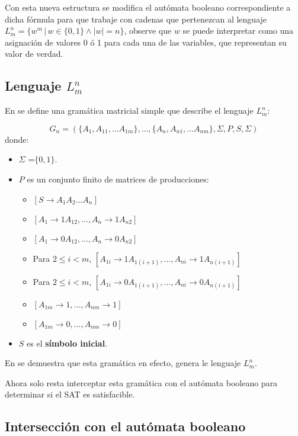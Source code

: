 \documentclass[12pt]{article}
\begin{document}
Con esta nueva estructura se modifica el autómata booleano correspondiente a dicha fórmula para que trabaje con 
cadenas que pertenezcan al lenguaje $L^n_m=\{w^m\,|\,w\in\{0,1\} \wedge |w|=n\}$, observe que $w$ se puede 
interpretar como una asignación de valores 0 ó 1 para cada una de las variables, que representan su valor de verdad.

\subsection{Lenguaje $L^n_m$}

En \cite{aSMSAT} se define una gramática matricial simple que describe el lenguaje $L^n_m$:

$$
      G_n=(\{A_1,A_{11},\ldots A_{1m}\},\ldots,\{A_n,A_{n1},\ldots A_{nm}\},\Sigma,P,S,\Sigma)
$$
donde:
\begin{itemize}
      \item \( \Sigma \) =$\{0,1\}$.
      \item \( P \) es un conjunto finito de matrices de producciones:
            \begin{itemize}
                  \item  $[S \to A_1A_2\ldots A_n]$
                  \item  $[A_1 \to 1A_{12}, \ldots, A_n \to 1A_{n2}]$
                  \item  $[A_1 \to 0A_{12}, \ldots, A_n \to 0A_{n2}]$
                  \item  Para $2 \leq i < m$, $[A_{1i} \to 1A_{1(i+1)}, \ldots, A_{ni} \to 1A_{n(i + 1)}]$
                  \item  Para $2 \leq i < m$, $[A_{1i} \to 0A_{1(i+1)}, \ldots, A_{ni} \to 0A_{n(i + 1)}]$
                  \item  $[A_{1m} \to 1, \ldots, A_{nm} \to 1]$
                  \item  $[A_{1m} \to 0, \ldots, A_{nm} \to 0]$
            \end{itemize}
      \item \( S \) es el \textbf{símbolo inicial}.
\end{itemize}

En \cite{simpleMatrixLanguages} se demuestra que esta gramática en efecto, genera le lenguaje $L^n_m$.

Ahora solo resta interceptar esta gramática con el autómata booleano para determinar si el SAT es satisfacible.

\subsection{Intersección con el autómata booleano}
\end{document}
